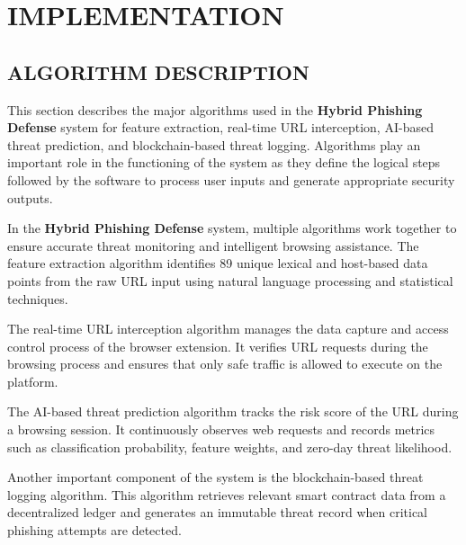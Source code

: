 
\chapter{IMPLEMENTATION}
\label{ch:implementation}

\section{ALGORITHM DESCRIPTION}

This section describes the major algorithms used in the \textbf{Hybrid Phishing Defense} system for feature extraction, real-time URL interception, AI-based threat prediction, and blockchain-based threat logging. Algorithms play an important role in the functioning of the system as they define the logical steps followed by the software to process user inputs and generate appropriate security outputs.

In the \textbf{Hybrid Phishing Defense} system, multiple algorithms work together to ensure accurate threat monitoring and intelligent browsing assistance. The feature extraction algorithm identifies 89 unique lexical and host-based data points from the raw URL input using natural language processing and statistical techniques. 

The real-time URL interception algorithm manages the data capture and access control process of the browser extension. It verifies URL requests during the browsing process and ensures that only safe traffic is allowed to execute on the platform.

The AI-based threat prediction algorithm tracks the risk score of the URL during a browsing session. It continuously observes web requests and records metrics such as classification probability, feature weights, and zero-day threat likelihood. 

Another important component of the system is the blockchain-based threat logging algorithm. This algorithm retrieves relevant smart contract data from a decentralized ledger and generates an immutable threat record when critical phishing attempts are detected.

